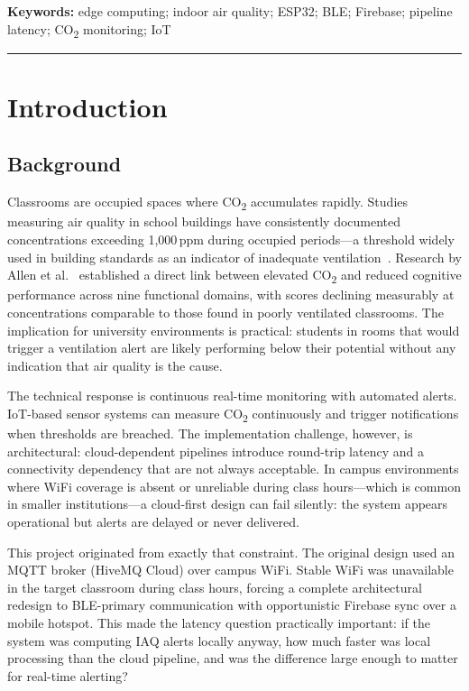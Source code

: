 \documentclass[12pt, a4paper]{article}
\begin{document}
\textbf{Keywords:} edge computing; indoor air quality; ESP32; BLE;
Firebase; pipeline latency; CO\textsubscript{2} monitoring; IoT

\hrule\vspace{14pt}

\section{Introduction}

\subsection{Background}

Classrooms are occupied spaces where CO\textsubscript{2} accumulates
rapidly. Studies measuring air quality in school buildings have
consistently documented concentrations exceeding 1{,}000\,ppm during
occupied periods---a threshold widely used in building standards as an
indicator of inadequate ventilation~\cite{fresh2013,almeida2017}.
Research by Allen et al.~\cite{allen2016} established a direct link
between elevated CO\textsubscript{2} and reduced cognitive performance
across nine functional domains, with scores declining measurably at
concentrations comparable to those found in poorly ventilated
classrooms. The implication for university environments is practical:
students in rooms that would trigger a ventilation alert are likely
performing below their potential without any indication that air
quality is the cause.

The technical response is continuous real-time monitoring with
automated alerts. IoT-based sensor systems can measure
CO\textsubscript{2} continuously and trigger notifications when
thresholds are breached. The implementation challenge, however, is
architectural: cloud-dependent pipelines introduce round-trip latency
and a connectivity dependency that are not always acceptable. In campus
environments where WiFi coverage is absent or unreliable during class
hours---which is common in smaller institutions---a cloud-first design
can fail silently: the system appears operational but alerts are
delayed or never delivered.

This project originated from exactly that constraint. The original
design used an MQTT broker (HiveMQ Cloud) over campus WiFi. Stable
WiFi was unavailable in the target classroom during class hours,
forcing a complete architectural redesign to BLE-primary communication
with opportunistic Firebase sync over a mobile hotspot. This made the
latency question practically important: if the system was computing
IAQ alerts locally anyway, how much faster was local processing than
the cloud pipeline, and was the difference large enough to matter for
real-time alerting?
\end{document}
